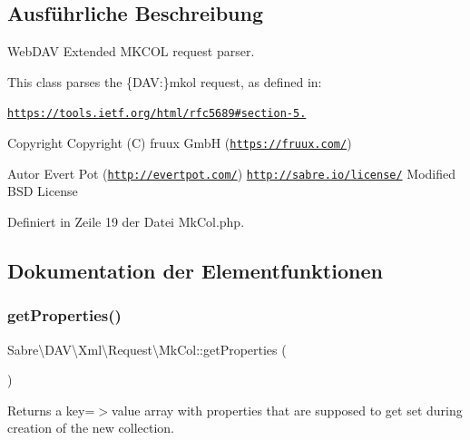 \subsection{Ausführliche Beschreibung}
Web\+D\+AV Extended M\+K\+C\+OL request parser.

This class parses the \{D\+AV\+:\}mkol request, as defined in\+:

\href{https://tools.ietf.org/html/rfc5689#section-5.1}{\tt https\+://tools.\+ietf.\+org/html/rfc5689\#section-\/5.}

\begin{DoxyCopyright}{Copyright}
Copyright (C) fruux GmbH (\href{https://fruux.com/}{\tt https\+://fruux.\+com/}) 
\end{DoxyCopyright}
\begin{DoxyAuthor}{Autor}
Evert Pot (\href{http://evertpot.com/}{\tt http\+://evertpot.\+com/})  \href{http://sabre.io/license/}{\tt http\+://sabre.\+io/license/} Modified B\+SD License 
\end{DoxyAuthor}


Definiert in Zeile 19 der Datei Mk\+Col.\+php.



\subsection{Dokumentation der Elementfunktionen}
\mbox{\label{class_sabre_1_1_d_a_v_1_1_xml_1_1_request_1_1_mk_col_a111dd4d6b986458e03c6d4ab948b3ee1}} 
\subsubsection{\texorpdfstring{get\+Properties()}{getProperties()}}
{\footnotesize\ttfamily Sabre\textbackslash{}\+D\+A\+V\textbackslash{}\+Xml\textbackslash{}\+Request\textbackslash{}\+Mk\+Col\+::get\+Properties (\begin{DoxyParamCaption}{ }\end{DoxyParamCaption})}

Returns a key=$>$value array with properties that are supposed to get set during creation of the new collection.

